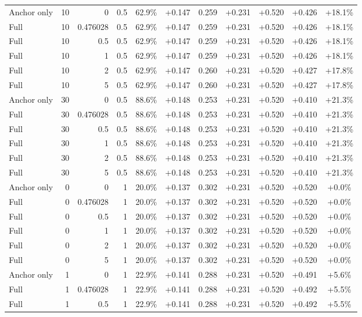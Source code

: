 \begin{table}[htbp]
\begin{tabular}{lrrrccccccc}
Anchor only & 10 & 0 & 0.5 & 62.9\% & +0.147 & 0.259 & +0.231 & +0.520 & +0.426 & +18.1\% \\
Full & 10 & 0.476028 & 0.5 & 62.9\% & +0.147 & 0.259 & +0.231 & +0.520 & +0.426 & +18.1\% \\
Full & 10 & 0.5 & 0.5 & 62.9\% & +0.147 & 0.259 & +0.231 & +0.520 & +0.426 & +18.1\% \\
Full & 10 & 1 & 0.5 & 62.9\% & +0.147 & 0.259 & +0.231 & +0.520 & +0.426 & +18.1\% \\
Full & 10 & 2 & 0.5 & 62.9\% & +0.147 & 0.260 & +0.231 & +0.520 & +0.427 & +17.8\% \\
Full & 10 & 5 & 0.5 & 62.9\% & +0.147 & 0.260 & +0.231 & +0.520 & +0.427 & +17.8\% \\
Anchor only & 30 & 0 & 0.5 & 88.6\% & +0.148 & 0.253 & +0.231 & +0.520 & +0.410 & +21.3\% \\
Full & 30 & 0.476028 & 0.5 & 88.6\% & +0.148 & 0.253 & +0.231 & +0.520 & +0.410 & +21.3\% \\
Full & 30 & 0.5 & 0.5 & 88.6\% & +0.148 & 0.253 & +0.231 & +0.520 & +0.410 & +21.3\% \\
Full & 30 & 1 & 0.5 & 88.6\% & +0.148 & 0.253 & +0.231 & +0.520 & +0.410 & +21.3\% \\
Full & 30 & 2 & 0.5 & 88.6\% & +0.148 & 0.253 & +0.231 & +0.520 & +0.410 & +21.3\% \\
Full & 30 & 5 & 0.5 & 88.6\% & +0.148 & 0.253 & +0.231 & +0.520 & +0.410 & +21.3\% \\
Anchor only & 0 & 0 & 1 & 20.0\% & +0.137 & 0.302 & +0.231 & +0.520 & +0.520 & +0.0\% \\
Full & 0 & 0.476028 & 1 & 20.0\% & +0.137 & 0.302 & +0.231 & +0.520 & +0.520 & +0.0\% \\
Full & 0 & 0.5 & 1 & 20.0\% & +0.137 & 0.302 & +0.231 & +0.520 & +0.520 & +0.0\% \\
Full & 0 & 1 & 1 & 20.0\% & +0.137 & 0.302 & +0.231 & +0.520 & +0.520 & +0.0\% \\
Full & 0 & 2 & 1 & 20.0\% & +0.137 & 0.302 & +0.231 & +0.520 & +0.520 & +0.0\% \\
Full & 0 & 5 & 1 & 20.0\% & +0.137 & 0.302 & +0.231 & +0.520 & +0.520 & +0.0\% \\
Anchor only & 1 & 0 & 1 & 22.9\% & +0.141 & 0.288 & +0.231 & +0.520 & +0.491 & +5.6\% \\
Full & 1 & 0.476028 & 1 & 22.9\% & +0.141 & 0.288 & +0.231 & +0.520 & +0.492 & +5.5\% \\
Full & 1 & 0.5 & 1 & 22.9\% & +0.141 & 0.288 & +0.231 & +0.520 & +0.492 & +5.5\% \\

\end{tabular}
\end{table}
